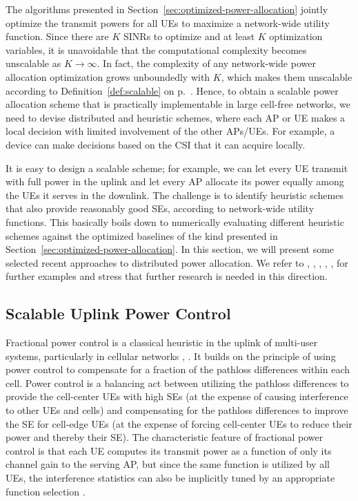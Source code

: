 The algorithms presented in Section~\ref{sec:optimized-power-allocation} jointly optimize the transmit powers for all UEs to maximize a network-wide utility function.
Since there are $K$ SINRs to optimize and at least $K$ optimization variables, it is unavoidable that the computational complexity becomes unscalable as $K \to \infty$.
In fact, the complexity of any network-wide power allocation optimization grows unboundedly with $K$, which makes them unscalable according to Definition~\ref{def:scalable} on p.~\pageref{def:scalable}. Hence, to obtain a scalable power allocation scheme that is practically implementable in large cell-free networks, we need to devise distributed and heuristic schemes, where each AP or UE makes a local decision with limited involvement of the other APs/UEs. For example, a device can make decisions based on the CSI that it can acquire locally.
 
It is easy to design a scalable scheme; for example, we can let every UE transmit with full power in the uplink and let every AP allocate its power equally among the UEs it serves in the downlink.
The challenge is to identify heuristic schemes that also provide reasonably good SEs, according to network-wide utility functions. This basically boils down to numerically evaluating different heuristic schemes against the optimized baselines of the kind presented in Section~\ref{sec:optimized-power-allocation}. In this section, we will present some selected recent approaches to distributed power allocation. We refer to \cite{Bjornson2011a}, \cite{Bjornson2010c}, \cite{Interdonato2019a}, \cite{Nayebi2017a}, \cite[Sec.~3.4.4]{Bjornson2013d}, for further examples and stress that further research is needed in this direction.

\enlargethispage{\baselineskip} 

\vspace{-2mm}
\subsection{Scalable Uplink Power Control}

Fractional power control is a classical heuristic in the uplink of multi-user systems, particularly in cellular networks \cite{Simonsson2008a}, \cite{Whitehead1993a}. It builds on the principle of using power control to compensate for a fraction of the pathloss differences within each cell. Power control is a balancing act between utilizing the pathloss differences to provide the cell-center UEs with high SEs (at the expense of causing interference to other UEs and cells) and compensating for the pathloss differences to improve the SE for cell-edge UEs (at the expense of forcing cell-center UEs to reduce their power and thereby their SE).
The characteristic feature of fractional power control is that each UE computes its transmit power as a function of only its channel gain to the serving AP, but since the same function is utilized by all UEs, the interference statistics can also be implicitly tuned by an appropriate function selection \cite{Whitehead1993a}.

